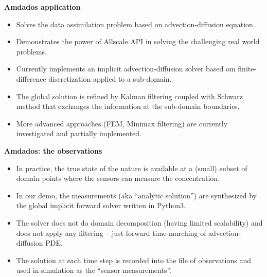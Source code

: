 \documentclass[12pt]{beamer}
\newcommand{\myTitle}{\rmfamily\bfseries}
\begin{document}

\begin{frame}{\myTitle Amdados application}
\begin{itemize}
\item Solves the data assimilation problem based on advection-diffusion equation.
\item Demonstrates the power of Allscale API in solving the challenging real world problems.
\item Currently implements an implicit advection-diffusion solver based om finite-difference discretization applied to a sub-domain.
\item The global solution is refined by Kalman filtering coupled with Schwarz method that exchanges the information at the sub-domain boundaries.
\item More advanced approaches (FEM, Minimax filtering) are currently investigated and partially implemented. 
\end{itemize}
\end{frame}

\begin{frame}{\myTitle Amdados:  the observations}
\begin{itemize}
\item In practice, the true state of the nature is available at a (small) subset of domain points where the sensors can measure the concentration.
\item In our demo, the measurements (aka “analytic solution”) are synthesized by the global implicit forward solver written in Python3.
\item The solver does not do domain decomposition (having limited scalability) and does not apply any filtering – just forward time-marching of advection-diffusion PDE.
\item The solution at each time step is recorded into the file of observations and used in simulation as the “sensor measurements”.
\end{itemize}
\end{frame}
\end{document}
